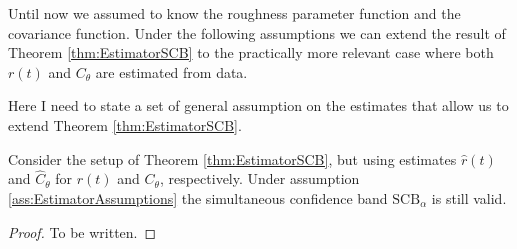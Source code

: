 Until now we assumed to know the roughness parameter function and the covariance
function. Under the following assumptions we can extend the result of Theorem
\ref{thm:EstimatorSCB} to the practically more relevant case where both $r(t)$ and
$C_\theta$ are estimated from data.

\begin{assumption}\label{ass:EstimatorAssumptions}
    Here I need to state a set of general assumption on the estimates that allow us to
    extend Theorem \ref{thm:EstimatorSCB}.
\end{assumption}

\begin{theorem}\label{thm:MainTheorem}
    Consider the setup of Theorem \ref{thm:EstimatorSCB}, but using estimates
    $\hat{r}(t)$ and $\hat{C}_\theta$ for $r(t)$ and $C_\theta$, respectively. Under
    assumption \ref{ass:EstimatorAssumptions} the simultaneous confidence band
    $\text{SCB}_\alpha$ is still valid.
\end{theorem}
\begin{proof}
    To be written.
\end{proof}
